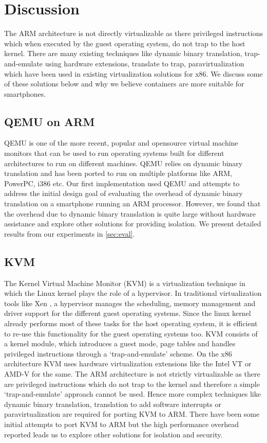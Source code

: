 \section{Discussion}
\label{sec:discuss}

The ARM architecture is not directly virtualizable as there privileged instructions which when executed by the guest operating system, do not trap to the host kernel. There are many existing techniques like dynamic binary translation, trap-and-emulate using hardware extensions, translate to trap, paravirtualization which have been used in existing virtualization solutions for x86. We discuss some of these solutions below and why we believe containers are more suitable for smartphones.

\subsection{QEMU on ARM}
QEMU \cite{qemu} is one of the more recent, popular and opensource virtual machine monitors that can be used to run operating systems built for different architectures to run on different machines. QEMU relies on dynamic binary translation and has been ported to run on multiple platforms like ARM, PowerPC, i386 etc. Our first implementation used QEMU and attempts to address the initial design goal of evaluating the overhead of dynamic binary translation on a smartphone running an ARM processor. However, we found that the overhead due to dynamic binary translation is quite large without hardware assistance and explore other solutions for providing isolation. We present detailed results from our experiments in \ref{sec:eval}.

\subsection{KVM}
The Kernel Virtual Machine Monitor (KVM) is a virtualization technique in which the Linux kernel plays the role of a hypervisor. In traditional virtualization tools like Xen \cite{xen}, a hypervisor manages the scheduling, memory management and driver support for the different guest operating systems. Since the linux kernel already performs most of these tasks for the host operating system, it is efficient to re-use this functionality for the guest operating systems too. KVM consists of a kernel module, which introduces a guest mode,  page tables and handles privileged instructions through a `trap-and-emulate' scheme. On the x86 architecture KVM uses hardware virtualization extensions like the Intel VT or AMD-V for the same. 
The ARM architecture is not strictly virtualizable as there are privileged instructions which do not trap to the kernel and therefore a simple `trap-and-emulate' approach cannot be used. Hence more complex techniques like dynamic binary translation, translation to add software interrupts or paravirtualization are required for porting KVM to ARM. There have been some initial attempts to port KVM to ARM \cite{columbia} but the high performance overhead reported leads us to explore other solutions for isolation and security. 


